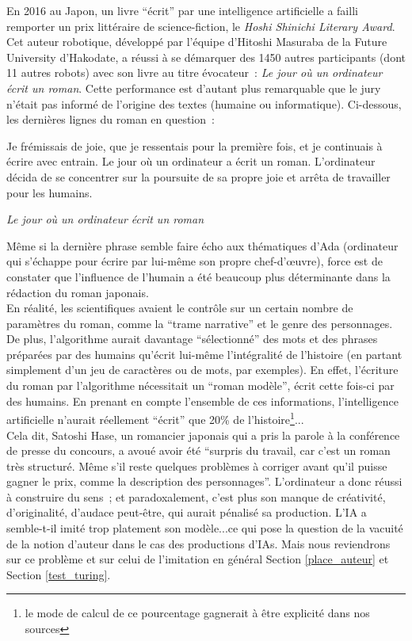 \documentclass{article}
\newenvironment{citationbox}
{\begin{center}
		\begin{minipage}{.8\textwidth}
		}
		{
		\end{minipage}	
\end{center}
}
\begin{document}
					En 2016 au Japon, un livre ``écrit'' par une intelligence artificielle a failli remporter un prix littéraire de science-fiction, le \textit{Hoshi Shinichi Literary Award}. Cet auteur robotique, développé par l'équipe d'Hitoshi Masuraba de la Future University d'Hakodate, a réussi à se démarquer des 1450 autres participants (dont 11 autres robots) avec son livre au titre évocateur~: \textit{Le jour où un ordinateur écrit un roman}. Cette performance est d'autant plus remarquable que le jury n'était pas informé de l'origine des textes (humaine ou informatique). Ci-dessous, les dernières lignes du roman en question~:
					\begin{citationbox}
						Je frémissais de joie, que je ressentais pour la première fois, et je continuais à écrire avec entrain. Le jour où un ordinateur a écrit un roman. L'ordinateur décida de se concentrer sur la poursuite de sa propre joie et arrêta de travailler pour les humains.
						\begin{flushright}
							\textit{Le jour où un ordinateur écrit un roman}
						\end{flushright}
					\end{citationbox}
					Même si la dernière phrase semble faire écho aux thématiques d'Ada (ordinateur qui s'échappe pour écrire par lui-même son propre chef-d'œuvre), force est de constater que l'influence de l'humain a été beaucoup plus déterminante dans la rédaction du roman japonais.\\
					En réalité, les scientifiques avaient le contrôle sur un certain nombre de paramètres du roman, comme la ``trame narrative'' et le genre des personnages. De plus, l'algorithme aurait davantage ``sélectionné'' des mots et des phrases préparées par des humains qu'écrit lui-même l'intégralité de l'histoire (en partant simplement d'un jeu de caractères ou de mots, par exemples). En effet, l'écriture du roman par l'algorithme nécessitait un ``roman modèle'', écrit cette fois-ci par des humains. En prenant en compte l'ensemble de ces informations, l'intelligence artificielle n'aurait réellement ``écrit'' que 20\% de l'histoire\footnote{le mode de calcul de ce pourcentage gagnerait à être explicité dans nos sources}...\\
					
					Cela dit, Satoshi Hase, un romancier japonais qui a pris la parole à la conférence de presse du concours, a avoué avoir été ``surpris du travail, car c'est un roman très structuré. Même s'il reste quelques problèmes à corriger avant qu'il puisse gagner le prix, comme la description des personnages''. L'ordinateur a donc réussi à construire du sens ; et paradoxalement, c'est plus son manque de créativité, d'originalité, d'audace peut-être, qui aurait pénalisé sa production. L'IA a  semble-t-il imité trop platement son modèle...ce qui pose la question de la vacuité de la notion d'auteur dans le cas des productions d'IAs. Mais nous reviendrons sur ce problème et sur celui de l'imitation en général Section \ref{place_auteur} et Section \ref{test_turing}.\\
					
\end{document}
